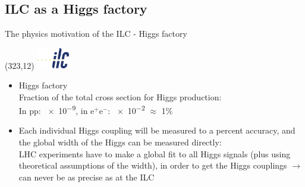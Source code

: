 \documentclass[xcolor={dvipsnames}]{beamer}
\newcommand{\ilclogo}{
  \setlength{\TPHorizModule}{1pt}
  \setlength{\TPVertModule}{1pt}
  \begin{textblock}{1}(323,12)
   \includegraphics[width=40pt,height=26pt]{figures/ILC.jpeg}
  \end{textblock}
}
\begin{document}
\subsection{ILC as a Higgs factory}
\begin{frame}{The physics motivation of the ILC - Higgs factory}
\ilclogo
\begin{itemize}
\item Higgs factory\\
Fraction of the total cross section for Higgs production:\\
In pp: \num{e-9}, in e$^+$e$^-$: \num{e-2} $\approx$ 1\%
\item Each individual Higgs coupling will be measured to a percent accuracy, and the global width of the Higgs can be measured directly:\\LHC experiments have to make a global fit to all Higgs signals (plus using theoretical assumptions of the width), in order to get the Higgs couplings $ \rightarrow$ can never be as precise as at the ILC
\end{itemize}
\end{frame}
\end{document}
